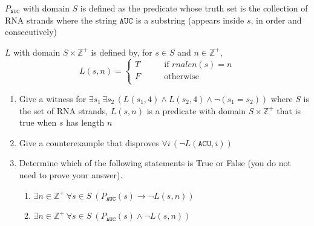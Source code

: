 \documentclass[12pt, oneside]{article}
\newcommand{\A}[0]{\texttt{A}}
\newcommand{\C}[0]{\texttt{C}}
\newcommand{\G}[0]{\texttt{G}}
\newcommand{\U}[0]{\texttt{U}}
\newif \ifsolution
\newcommand{\sol}[1]{\medskip\fbox{\begin{minipage}{5.5in}{#1}\end{minipage}}\medskip}
\begin{document}
\begin{description}
$P_{\A\U\C}$ with domain $S$ is defined as the predicate whose truth set
is the collection of RNA strands where the string $\A\U\C$
is a substring (appears inside $s$, in order and consecutively)

$L$ with domain $S \times \mathbb{Z}^+$ is defined by, for $s \in S$ and $n \in \mathbb{Z}^+$,
\[
L( s, n) = \begin{cases}
T &\qquad\text{if $rnalen(s) = n$}\\
F &\qquad\text{otherwise}\\
\end{cases}
\]
\begin{enumerate}\item Give a witness for $\exists s_1  \, \exists s_2 \,(L(s_1, 4) \land L(s_2,4) \land 
\neg ( s_1 = s_2) )$ where $S$ is
the set of RNA strands, $L(s, n)$ is a predicate with domain $S
\times \mathbb{Z}^+$ that is true when $s$ has length $n$

\ifsolution
\sol{
In English, the statement  can be translated to ``There  are strands $s_1, s_2$ where each has length
$4$ and the strands are not equal."
A witness  is  $s_1 = \C\C\C\C$, $s_2 = \G\G\G\G$.  Since  each of  $s_1, s_2$ is  an element of $S$, 
$s_1$ has  length $4$, $s_2$ has length $4$ and these two strings are not the same.
} 
\else{}
\fi

\item Give a counterexample that disproves  
$\forall i  \,(\neg L(\A\C\U, i)) $ 

\ifsolution
\sol{
In English, the statement  can be translated to ``No positive integer is the length of  the strand \A\C\U."

A counterexample that helps us  disprove this statement is $3$.  This is a positive integer and
is the length of $\A\C\U$ so  $L(\A\C\U, 3)$ is True, hence $\neg L(\A\C\U, 3)$
is False.}
\else{}
\fi

\item Determine which of the following statements is True or False (you do not need to prove your answer).
\begin{enumerate}\item $\exists n \in \mathbb{Z}^+~ \forall s \in S~ ( P_{\A\U\C}(s) \to \lnot L(s,n) )$

\ifsolution{\sol{In English, this statement is saying that there is a positive integer that is not the length of every
RNA strand with $\A\U\C$.  This is {\bf true}, as we can see with the witness $n = 1$.
}}\fi

\item $\exists n \in \mathbb{Z}^+~ \forall s \in S~ ( P_{\A\U\C}(s) \land \lnot L(s,n) )$


\end{enumerate}
\end{enumerate}
\end{description}
\end{document}
